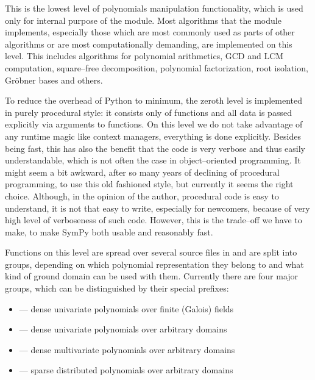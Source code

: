 This is the lowest level of polynomials manipulation functionality, which is used only for internal
purpose of the module. Most algorithms that the module implements, especially those which are most
commonly used as parts of other algorithms or are most computationally demanding, are implemented
on this level. This includes algorithms for polynomial arithmetics, GCD and LCM computation,
square--free decomposition, polynomial factorization, root isolation, Gröbner bases and others.

To reduce the overhead of Python to minimum, the zeroth level is implemented in purely procedural
style: it consists only of functions and all data is passed explicitly via arguments to functions.
On this level we do not take advantage of any runtime magic like context managers, everything is
done explicitly. Besides being fast, this has also the benefit that the code is very verbose and
thus easily understandable, which is not often the case in object--oriented programming. It might
seem a bit awkward, after so many years of declining of procedural programming, to use this old
fashioned style, but currently it seems the right choice. Although, in the opinion of the author,
procedural code is easy to understand, it is not that easy to write, especially for newcomers,
because of very high level of verboseness of such code. However, this is the trade--off we have
to make, to make SymPy both usable and reasonably fast.

Functions on this level are spread over several source files in  and are split into
groups, depending on which polynomial representation they belong to and what kind of ground domain
can be used with them. Currently there are four major groups, which can be distinguished by their
special prefixes:
\begin{itemize}
\item {}
 --- dense univariate polynomials over finite (Galois) fields

\item {}
 --- dense univariate polynomials over arbitrary domains

\item {}
 --- dense multivariate polynomials over arbitrary domains

\item {}
 --- sparse distributed polynomials over arbitrary domains

\end{itemize}

